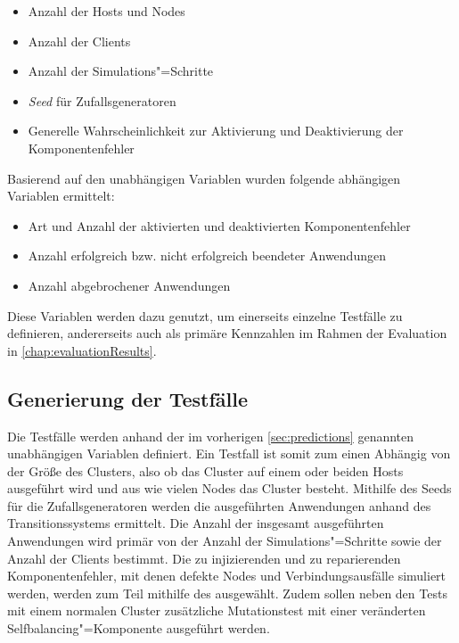 \begin{itemize}
    \item Anzahl der Hosts und Nodes
    \item Anzahl der Clients
    \item Anzahl der Simulations"=Schritte
    \item \emph{Seed} für Zufallsgeneratoren
    \item Generelle Wahrscheinlichkeit zur Aktivierung und Deaktivierung der Komponentenfehler
\end{itemize}

Basierend auf den unabhängigen Variablen wurden folgende abhängigen Variablen ermittelt:

\begin{itemize}
    \item Art und Anzahl der aktivierten und deaktivierten Komponentenfehler
    \item Anzahl erfolgreich bzw. nicht erfolgreich beendeter Anwendungen
    \item Anzahl abgebrochener Anwendungen
\end{itemize}

Diese Variablen werden dazu genutzt, um einerseits einzelne Testfälle zu definieren, andererseits auch als primäre Kennzahlen im Rahmen der Evaluation in \autoref{chap:evaluationResults}.

\subsection{Generierung der Testfälle}
\label{sec:testcaseGeneration}

Die Testfälle werden anhand der im vorherigen \autoref{sec:predictions} genannten unabhängigen Variablen definiert.
Ein Testfall ist somit zum einen Abhängig von der Größe des Clusters, also ob das Cluster auf einem oder beiden Hosts ausgeführt wird und aus wie vielen Nodes das Cluster besteht.
Mithilfe des Seeds für die Zufallsgeneratoren werden die ausgeführten Anwendungen anhand des Transitionssystems ermittelt.
Die Anzahl der insgesamt ausgeführten Anwendungen wird primär von der Anzahl der Simulations"=Schritte sowie der Anzahl der Clients bestimmt.
Die zu injizierenden und zu reparierenden Komponentenfehler, mit denen defekte Nodes und Verbindungsausfälle simuliert werden, werden zum Teil mithilfe des ausgewählt.
Zudem sollen neben den Tests mit einem normalen Cluster zusätzliche Mutationstest mit einer veränderten Selfbalancing"=Komponente ausgeführt werden.

